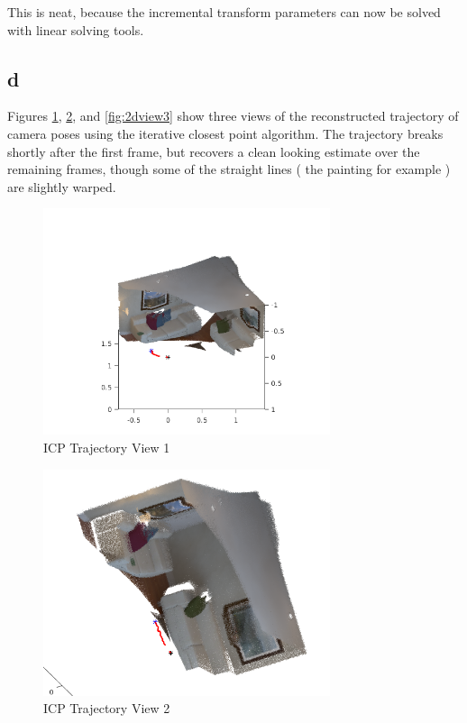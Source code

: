 \documentclass[12pt]{article}
\begin{document}
This is neat, because the incremental transform parameters can now be solved with linear solving tools.

\subsection{d}
Figures \ref{fig:2dview1}, \ref{fig:2dview2}, and \ref{fig:2dview3} show three views of the reconstructed trajectory of camera poses using the iterative closest point algorithm. The trajectory breaks shortly after the first frame, but recovers a clean looking estimate over the remaining frames, though some of the straight lines ( the painting for example ) are slightly warped.


\begin{figure}[H]
\centering
\includegraphics[page=1,width=0.75\textwidth]{2d_view1}
\caption{ ICP Trajectory View 1 } 
\label{fig:2dview1}
\end{figure}   

\begin{figure}[H]
\centering
\includegraphics[page=1,width=0.75\textwidth]{2d_view2}
\caption{ ICP Trajectory View 2 } 
\label{fig:2dview2}
\end{figure}   
\end{document}
